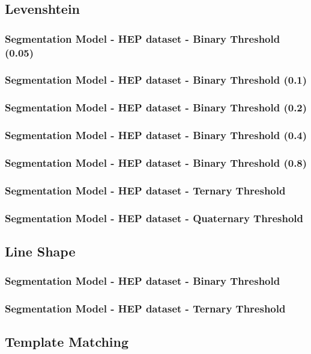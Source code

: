 \documentclass[10pt, oneside]{scrartcl}   	%
\begin{document}
\subsection{Levenshtein}
\subsubsection{Segmentation Model - HEP dataset - Binary Threshold (0.05)}
\subsubsection{Segmentation Model - HEP dataset - Binary Threshold (0.1)}
\subsubsection{Segmentation Model - HEP dataset - Binary Threshold (0.2)}
\subsubsection{Segmentation Model - HEP dataset - Binary Threshold (0.4)}
\subsubsection{Segmentation Model - HEP dataset - Binary Threshold (0.8)}
\subsubsection{Segmentation Model - HEP dataset - Ternary Threshold}
\subsubsection{Segmentation Model - HEP dataset - Quaternary Threshold}
\subsection{Line Shape}
\subsubsection{Segmentation Model - HEP dataset - Binary Threshold}
\subsubsection{Segmentation Model - HEP dataset - Ternary Threshold}
\subsection{Template Matching}
\end{document}
